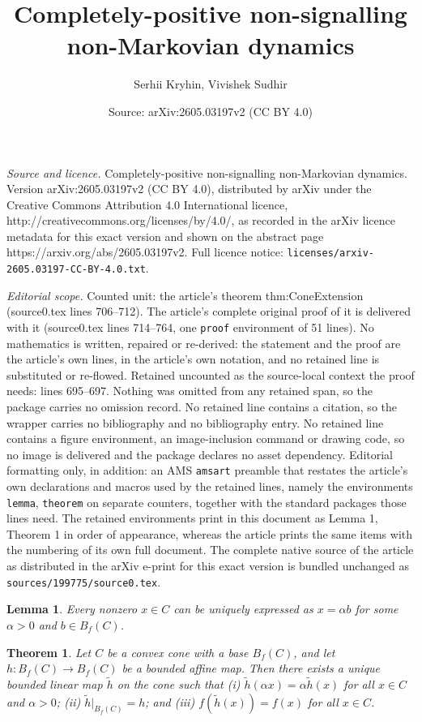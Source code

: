\documentclass[10pt,a4paper]{amsart}
\title{Completely-positive non-signalling non-Markovian dynamics}
\author{Serhii Kryhin, Vivishek Sudhir}
\date{Source: arXiv:2605.03197v2 (CC BY 4.0)}
\newtheorem{lemma}{Lemma}
\newtheorem{theorem}{Theorem}
\begin{document}
\maketitle

\noindent\emph{Source and licence.} Completely-positive non-signalling non-Markovian dynamics. Version arXiv:2605.03197v2 (CC BY 4.0), distributed by arXiv under the Creative Commons Attribution 4.0 International licence, http://creativecommons.org/licenses/by/4.0/, as recorded in the arXiv licence metadata for this exact version and shown on the abstract page https://arxiv.org/abs/2605.03197v2. Full licence notice: \texttt{licenses/arxiv-2605.03197-CC-BY-4.0.txt}.\par\smallskip

\noindent\textit{Editorial scope.} Counted unit: the article's theorem thm:ConeExtension (source0.tex lines 706--712). The article's complete original proof of it is delivered with it (source0.tex lines 714--764, one \texttt{proof} environment of 51 lines). No mathematics is written, repaired or re-derived: the statement and the proof are the article's own lines, in the article's own notation, and no retained line is substituted or re-flowed.  Retained uncounted as the source-local context the proof needs: lines 695--697.  Nothing was omitted from any retained span, so the package carries no omission record.  No retained line contains a citation, so the wrapper carries no bibliography and no bibliography entry.  No retained line contains a figure environment, an image-inclusion command or drawing code, so no image is delivered and the package declares no asset dependency.  Editorial formatting only, in addition: an AMS \texttt{amsart} preamble that restates the article's own declarations and macros used by the retained lines, namely the environments \texttt{lemma}, \texttt{theorem} on separate counters, together with the standard packages those lines need.  The retained environments print in this document as Lemma 1, Theorem 1 in order of appearance, whereas the article prints the same items with the numbering of its own full document.  The complete native source of the article as distributed in the arXiv e-print for this exact version is bundled unchanged as \texttt{sources/199775/source0.tex}.
\begin{lemma}\label{lem:UniqueDecomp}
	Every nonzero $x\in C$ can be uniquely expressed as $x = \alpha b$ for some $\alpha > 0$ and $b \in B_f(C)$.
\end{lemma}

\begin{theorem}\label{thm:ConeExtension}
Let $C$ be a convex cone with a base $B_f(C)$, and let $h: B_f(C) \rightarrow B_f(C)$ be a bounded affine
map. Then there exists a unique bounded linear map $\tilde h$ on the cone such that 
(i) $\tilde h(\alpha x) = \alpha \tilde{h}(x)$ for all $x\in C$ and $\alpha > 0$; 
(ii) $\tilde h\vert_{B_f(C)} = h$; and 
(iii) $f(\tilde h(x)) = f(x)$ for all $x \in C$. 
\end{theorem}
\end{document}

